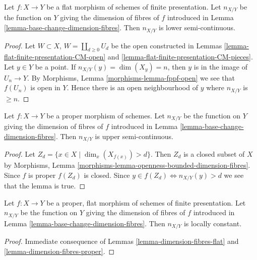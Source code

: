 \begin{lemma}
\label{lemma-dimension-fibres-flat}
Let $f : X \to Y$ be a flat morphism of schemes of finite presentation. Let
$n_{X/Y}$ be the function on $Y$ giving the dimension of fibres of $f$
introduced in Lemma \ref{lemma-base-change-dimension-fibres}.
Then $n_{X/Y}$ is lower semi-continuous.
\end{lemma}

\begin{proof}
Let $W \subset X$, $W = \coprod_{d \geq 0} U_d$ be the open constructed in
Lemmas \ref{lemma-flat-finite-presentation-CM-open} and
\ref{lemma-flat-finite-presentation-CM-pieces}.
Let $y \in Y$ be a point. If $n_{X/Y}(y) = \dim(X_y) = n$, then
$y$ is in the image of $U_n \to Y$.
By Morphisms, Lemma \ref{morphisms-lemma-fppf-open}
we see that $f(U_n)$ is open in $Y$.
Hence there is an open neighbourhood of $y$ where
$n_{X/Y}$ is $\geq n$.
\end{proof}

\begin{lemma}
\label{lemma-dimension-fibres-proper}
Let $f : X \to Y$ be a proper morphism of schemes. Let
$n_{X/Y}$ be the function on $Y$ giving the dimension of fibres of $f$
introduced in Lemma \ref{lemma-base-change-dimension-fibres}.
Then $n_{X/Y}$ is upper semi-continuous.
\end{lemma}

\begin{proof}
Let $Z_d = \{x \in X \mid \dim_x(X_{f(x)}) > d\}$.
Then $Z_d$ is a closed subset of $X$ by
Morphisms, Lemma \ref{morphisms-lemma-openness-bounded-dimension-fibres}.
Since $f$ is proper $f(Z_d)$ is closed.
Since $y \in f(Z_d) \Leftrightarrow n_{X/Y}(y) > d$
we see that the lemma is true.
\end{proof}

\begin{lemma}
\label{lemma-dimension-fibres-proper-flat}
Let $f : X \to Y$ be a proper, flat morphism of schemes of finite presentation.
Let $n_{X/Y}$ be the function on $Y$ giving the dimension of fibres of $f$
introduced in Lemma \ref{lemma-base-change-dimension-fibres}.
Then $n_{X/Y}$ is locally constant.
\end{lemma}

\begin{proof}
Immediate consequence of
Lemmas \ref{lemma-dimension-fibres-flat} and
\ref{lemma-dimension-fibres-proper}.
\end{proof}

















